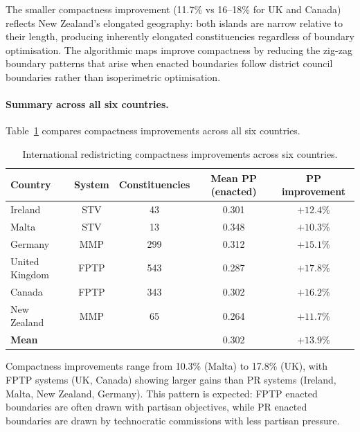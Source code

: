 The smaller compactness improvement (11.7\% vs 16--18\% for UK and Canada)
reflects New Zealand's elongated geography: both islands are narrow relative
to their length, producing inherently elongated constituencies regardless of
boundary optimisation.
The algorithmic maps improve compactness by reducing the zig-zag boundary
patterns that arise when enacted boundaries follow district council boundaries
rather than isoperimetric optimisation.

\paragraph{Summary across all six countries.}
Table~\ref{tab:international-summary} compares compactness improvements across
all six countries.

\begin{table}[h]
\centering\small
\caption{International redistricting compactness improvements across six countries.}
\label{tab:international-summary}
\begin{tabular}{lcccc}
\toprule
Country & System & Constituencies & Mean PP (enacted) & PP improvement \\
\midrule
Ireland     & STV  &  43 & 0.301 & $+12.4\%$ \\
Malta       & STV  &  13 & 0.348 & $+10.3\%$ \\
Germany     & MMP  & 299 & 0.312 & $+15.1\%$ \\
United Kingdom & FPTP & 543 & 0.287 & $+17.8\%$ \\
Canada      & FPTP & 343 & 0.302 & $+16.2\%$ \\
New Zealand & MMP  &  65 & 0.264 & $+11.7\%$ \\
\midrule
\textbf{Mean} & & & 0.302 & $\mathbf{+13.9\%}$ \\
\bottomrule
\end{tabular}
\end{table}

Compactness improvements range from 10.3\% (Malta) to 17.8\% (UK),
with FPTP systems (UK, Canada) showing larger gains than PR systems
(Ireland, Malta, New Zealand, Germany).
This pattern is expected: FPTP enacted boundaries are often drawn with
partisan objectives, while PR enacted boundaries are drawn by technocratic
commissions with less partisan pressure.
